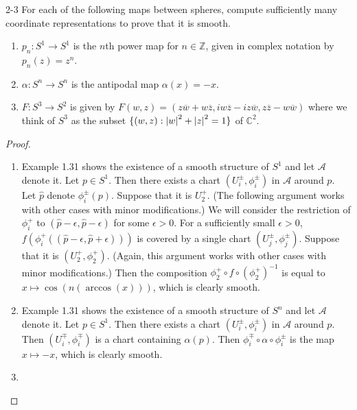 \begin{customprob}{2-3}\label{problem_2_3}
  For each of the following maps between spheres, compute sufficiently many coordinate representations to prove that it is smooth.

  \begin{enumerate}[label=(\alph*)]
    \item 
      $p_n: S^1 \rightarrow S^1$ is the $n$th power map for $n \in \mathbb{Z}$, given in complex notation by $p_n(z) = z^n$.
    \item
      $\alpha: S^n \rightarrow S^n$ is the antipodal map $\alpha(x) = -x$.
    \item
      $F: S^3 \rightarrow S^2$ is given by $F(w, z) = (z\overline{w} + w\overline{z}, iw\overline{z} - iz\overline{w}, z\overline{z} - w\overline{w})$ where we think of $S^3$ as the subset $\{ (w, z) : \abs{w}^2 + \abs{z}^2 = 1 \}$ of $\mathbb{C}^2$.
  \end{enumerate}
\end{customprob}

\begin{proof}
  $ $
  \begin{enumerate}[label=(\alph*)]
    \item 
      Example 1.31 shows the existence of a smooth structure of $S^1$ and let $\mathcal{A}$ denote it.
      Let $p \in S^1$.
      Then there exists a chart $(U_i^{\pm}, \phi_i^{\pm})$ in $\mathcal{A}$ around $p$.
      Let $\hat{p}$ denote $\phi_i^{\pm}(p)$.
      Suppose that it is $U_2^{+}$.
      (The following argument works with other cases with minor modifications.)
      We will consider the restriction of $\phi_i^{+}$ to $(\hat{p} - \epsilon, \hat{p} - \epsilon)$ for some $\epsilon > 0$.
      For a sufficiently small $\epsilon > 0$, $f(\phi_i^{+}((\hat{p} - \epsilon, \hat{p} + \epsilon)))$ is covered by a single chart $(U_j^{\pm}, \phi_j^{\pm})$.
      Suppose that it is $(U_2^{+}, \phi_2^{+})$.
      (Again, this argument works with other cases with minor modifications.)
      Then the composition $\phi_2^{+} \circ f \circ (\phi_2^{+})^{-1}$ is equal to $x \mapsto \cos(n(\arccos(x)))$, which is clearly smooth.
    \item
      Example 1.31 shows the existence of a smooth structure of $S^n$ and let $\mathcal{A}$ denote it.
      Let $p \in S^1$.
      Then there exists a chart $(U_i^{\pm}, \phi_i^{\pm})$ in $\mathcal{A}$ around $p$.
      Then $(U_i^{\mp}, \phi_i^{\mp})$ is a chart containing $\alpha(p)$.
      Then $\phi_i^{\mp} \circ \alpha \circ \phi_i^{\pm}$ is the map $x \mapsto -x$, which is clearly smooth.
    \item
  \end{enumerate}
\end{proof}
